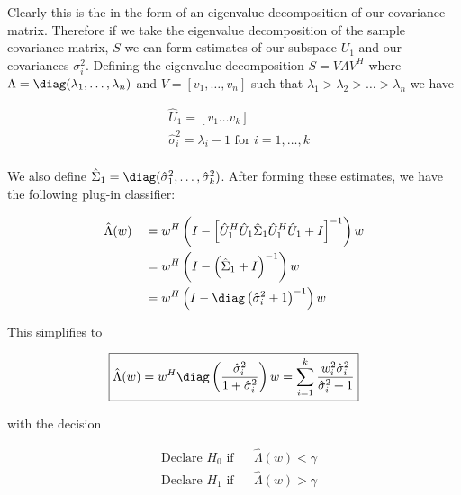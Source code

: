 \documentclass[english]{article}
\begin{document}
Clearly this is the in the form of an eigenvalue decomposition of our covariance matrix. Therefore if we take the eigenvalue decomposition of the sample covariance matrix, $S$ we can form estimates of our subspace $U_1$ and our covariances $\sigma_i^2$. Defining the eigenvalue decomposition $S=V\Lambda V^H$ where $\Lambda = \diag(\lambda_1,\dots,\lambda_n)$ and $V=[v_1,\dots, v_n]$ such that $\lambda_1>\lambda_2>\dots>\lambda_n$ we have

\begin{equation}
\begin{aligned}
&\hat{U}_1=[v_1 \dots v_k]\\
&\hat{\sigma}_i^2 = \lambda_i -1 \text{ for } i=1,\dots,k\\
\end{aligned}
\end{equation}

We also define $\hat{\Sigma}_1=\diag(\hat{\sigma}_1^2,\dots,\hat{\sigma}_k^2)$. After forming these estimates, we have the following plug-in classifier:

\begin{equation}
\begin{aligned}
&\hat{\Lambda}(w)
&& = w^H\left(I-\left[\hat{U}_1^H\hat{U}_1\hat{\Sigma}_1\hat{U}_1^H\hat{U}_1 + I\right]^{-1}\right)w\\
&&& = w^H\left(I-\left(\hat{\Sigma}_1+I\right)^{-1}\right)w\\
&&& = w^H\left(I-\diag\left(\hat{\sigma}_i^2+1\right)^{-1}\right)w\\
\end{aligned}
\end{equation}

This simplifies to

\begin{equation}\label{eq:proc mr plugin}
\boxed{\hat{\Lambda}(w) = w^H\diag\left(\frac{\hat{\sigma}^2_i}{1+\hat{\sigma}^2_i}\right)w=\sum_{i=1}^k\frac{w_i^2\hat{\sigma}_i^2}{\hat{\sigma}_i^2+1}}
\end{equation}

with the decision

\begin{equation}
\begin{aligned}
&\text{Declare } H_0 \text{ if}
&& \hat{\Lambda}(w) < \gamma\\
& \text{Declare } H_1 \text{ if}
&& \hat{\Lambda}(w) > \gamma\\
\end{aligned}
\end{equation}
\end{document}

